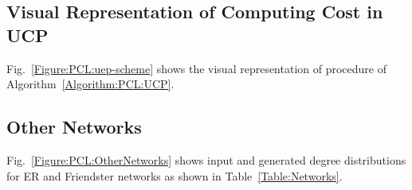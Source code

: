 \documentclass[conference,letterpaper,10pt]{IEEEtran}
\newcommand{\Figure}{Fig.\xspace}
\begin{document}
\subsection{Visual Representation of Computing Cost in UCP}
\label{Figure:Schematic Diagram}

\Figure~\ref{Figure:PCL:uep-scheme} shows the visual representation of  procedure of Algorithm~\ref{Algorithm:PCL:UCP}.



\subsection{Other Networks}
\label{Section:OtherNetworks}

\Figure~\ref{Figure:PCL:OtherNetworks} shows input and generated degree distributions for ER and Friendster networks as shown in Table~\ref{Table:Networks}.
\end{document}
